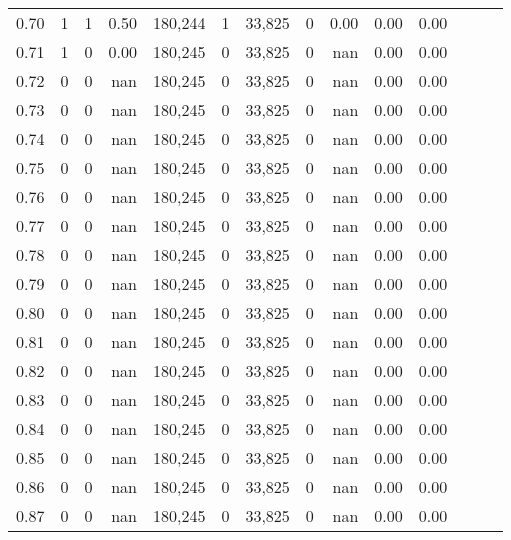 \begin{tabular}{rrrrrrrrrrrrrr}
0.70 &       1 &      1 &  0.50 &  180,244 &        1 &  33,825 &       0 &  0.00 &  0.00 &      0.00 \\
0.71 &       1 &      0 &  0.00 &  180,245 &        0 &  33,825 &       0 &   nan &  0.00 &      0.00 \\
0.72 &       0 &      0 &   nan &  180,245 &        0 &  33,825 &       0 &   nan &  0.00 &      0.00 \\
0.73 &       0 &      0 &   nan &  180,245 &        0 &  33,825 &       0 &   nan &  0.00 &      0.00 \\
0.74 &       0 &      0 &   nan &  180,245 &        0 &  33,825 &       0 &   nan &  0.00 &      0.00 \\
0.75 &       0 &      0 &   nan &  180,245 &        0 &  33,825 &       0 &   nan &  0.00 &      0.00 \\
0.76 &       0 &      0 &   nan &  180,245 &        0 &  33,825 &       0 &   nan &  0.00 &      0.00 \\
0.77 &       0 &      0 &   nan &  180,245 &        0 &  33,825 &       0 &   nan &  0.00 &      0.00 \\
0.78 &       0 &      0 &   nan &  180,245 &        0 &  33,825 &       0 &   nan &  0.00 &      0.00 \\
0.79 &       0 &      0 &   nan &  180,245 &        0 &  33,825 &       0 &   nan &  0.00 &      0.00 \\
0.80 &       0 &      0 &   nan &  180,245 &        0 &  33,825 &       0 &   nan &  0.00 &      0.00 \\
0.81 &       0 &      0 &   nan &  180,245 &        0 &  33,825 &       0 &   nan &  0.00 &      0.00 \\
0.82 &       0 &      0 &   nan &  180,245 &        0 &  33,825 &       0 &   nan &  0.00 &      0.00 \\
0.83 &       0 &      0 &   nan &  180,245 &        0 &  33,825 &       0 &   nan &  0.00 &      0.00 \\
0.84 &       0 &      0 &   nan &  180,245 &        0 &  33,825 &       0 &   nan &  0.00 &      0.00 \\
0.85 &       0 &      0 &   nan &  180,245 &        0 &  33,825 &       0 &   nan &  0.00 &      0.00 \\
0.86 &       0 &      0 &   nan &  180,245 &        0 &  33,825 &       0 &   nan &  0.00 &      0.00 \\
0.87 &       0 &      0 &   nan &  180,245 &        0 &  33,825 &       0 &   nan &  0.00 &      0.00 \\

\end{tabular}
